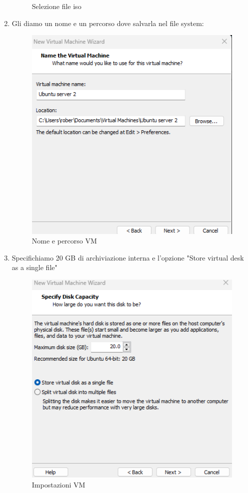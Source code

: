 \documentclass[12pt,a4paper,twoside]{book}
\begin{document}
\begin{enumerate}
\begin{figure}[H]
        \caption{Selezione file iso}
        \label{fig:select_iso}
    \end{figure}
    \item Gli diamo un nome e un percorso dove salvarla nel file system:
    \begin{figure}[H]
        \centering
        \includegraphics[width=.7\linewidth]{tesi/img/nome_percorso_VM.png}
        \caption{Nome e percorso VM}
        \label{fig:nome_percorso_VM}
    \end{figure}
    \item Specifichiamo 20 GB di archiviazione interna e l'opzione "Store virtual desk as a single file"
    \begin{figure}[H]
        \centering
        \includegraphics[width=.7\linewidth]{tesi/img/settings_VM.png}
        \caption{Impostazioni VM}
        \label{fig:settings_VM}

\end{figure}
\end{enumerate}
\end{document}
